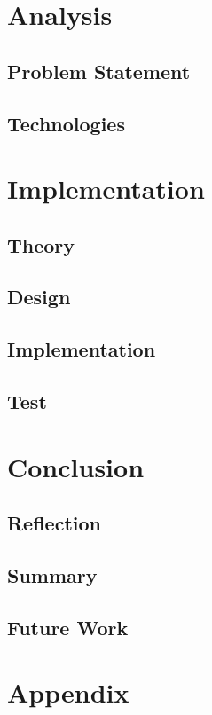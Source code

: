 




 
\tableofcontents



\part{Analysis}



\chapter{Problem Statement}



\chapter{Technologies}


\part{Implementation}

\chapter{Theory}

\chapter{Design}

\chapter{Implementation}

\chapter{Test}


\part{Conclusion}

\chapter{Reflection}


\chapter{Summary}


\chapter{Future Work}


\printbibliography

\part{Appendix}
\appendix


 
